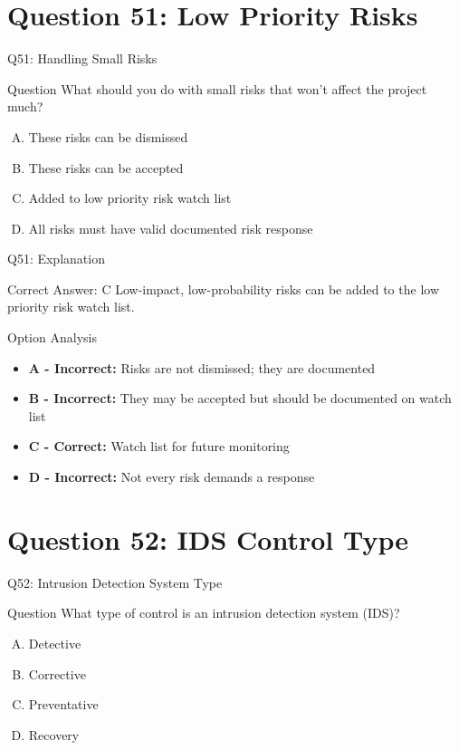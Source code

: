 \documentclass{beamer}
\begin{document}
	\section{Question 51: Low Priority Risks}
	
	\begin{frame}{Q51: Handling Small Risks}
		\begin{block}{Question}
			What should you do with small risks that won't affect the project much?
		\end{block}
		\begin{enumerate}[(A)]
			\item These risks can be dismissed
			\item These risks can be accepted
			\item Added to low priority risk watch list
			\item All risks must have valid documented risk response
		\end{enumerate}
	\end{frame}
	
	\begin{frame}{Q51: Explanation}
		\begin{block}{Correct Answer: C}
			Low-impact, low-probability risks can be added to the low priority risk watch list.
		\end{block}
		\begin{block}{Option Analysis}
			\begin{itemize}
				\item \textbf{A - Incorrect:} Risks are not dismissed; they are documented
				\item \textbf{B - Incorrect:} They may be accepted but should be documented on watch list
				\item \textbf{C - Correct:} Watch list for future monitoring
				\item \textbf{D - Incorrect:} Not every risk demands a response
			\end{itemize}
		\end{block}
	\end{frame}
	
	\section{Question 52: IDS Control Type}
	
	\begin{frame}{Q52: Intrusion Detection System Type}
		\begin{block}{Question}
			What type of control is an intrusion detection system (IDS)?
		\end{block}
		\begin{enumerate}[(A)]
			\item Detective
			\item Corrective
			\item Preventative
			\item Recovery
		\end{enumerate}
	\end{frame}
	
\end{document}
